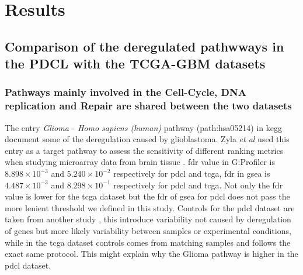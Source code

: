 \section{Results}

\subsection{Comparison of the deregulated pathwways in the PDCL with the TCGA-GBM datasets}

\subsubsection{Pathways mainly involved in the Cell-Cycle, DNA replication and Repair are shared between the two datasets}

The entry \textit{Glioma - Homo sapiens (human)} pathway (path:hsa05214) in \acrshort{kegg} document some of the deregulation caused by glioblastoma.
Zyla \textit{et al} used this entry as a target pathway to assess the sensitivity of different ranking metrics when studying microarray data from brain tissue \cite*{Zyla2017}.
\acrshort{fdr} value in G:Profiler is $8.898 \times 10^{-3}$ and $5.240 \times 10^{-2}$ respectively for \acrshort{pdcl} and \acrshort{tcga}, \acrshort{fdr} in \acrshort{gsea} is $4.487 \times 10^{-3}$ and $8.298 \times 10^{-1}$ respectively for \acrshort{pdcl} and \acrshort{tcga}.
Not only the \acrshort{fdr} value is lower for the \acrshort{tcga} dataset but the \acrshort{fdr} of \acrshort{gsea} for \acrshort{pdcl} does not pass the more lenient threshold we defined in this study.
Controls for the \acrshort{pdcl} dataset are taken from another study \cite*{Lundin2018}, this introduce variability not caused by deregulation of genes but more likely variability between samples or experimental conditions, while in the \acrshort{tcga} dataset controls comes from matching samples and follows the exact same protocol.
This might explain why the Glioma pathway is higher in the \acrshort{pdcl} dataset.

